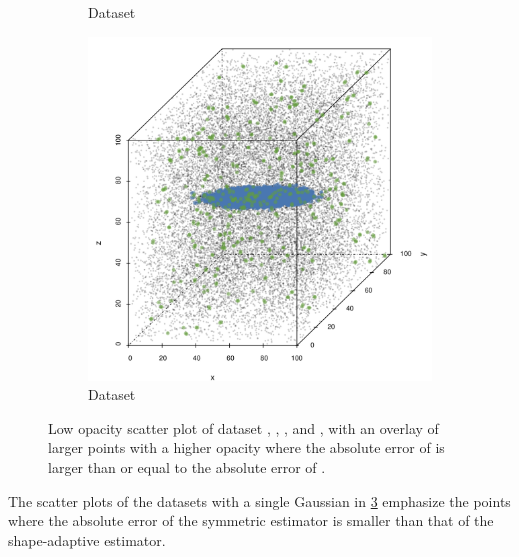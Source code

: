 \begin{figure}
\begin{subfigure}{0.23\textwidth}
		\caption{Dataset \baakmanFour}
		\label{fig:discussion:singleSphere:mbeLowerError:baakman4}
	\end{subfigure}		
	\begin{subfigure}{0.23\textwidth}
		\centering
		\includegraphics[keepaspectratio=true, width=\textwidth, height=0.23\textheight]{discussion/img/baakman_5_abs_error_mbeSmallerThansambe}
		\caption{Dataset \baakmanFive}
		\label{fig:discussion:singleSphere:mbeLowerError:baakman5}
	\end{subfigure}			
	\caption{Low opacity scatter plot of dataset %
		 \ferdosiOne, %
		 \baakmanOne, %
		 \baakmanFour, and%
		 \baakmanFive, %
		with an overlay of larger points with a higher opacity where the absolute error of \sambe is larger than or equal to the absolute error of \mbe.}
	\label{fig:discussion:singleSphere:mbeLowerError}
\end{figure}

The scatter plots of the datasets with a single Gaussian in \cref{fig:discussion:singleSphere:mbeLowerError} emphasize the points where the absolute error of the symmetric estimator is smaller than that of the shape-adaptive estimator. 

